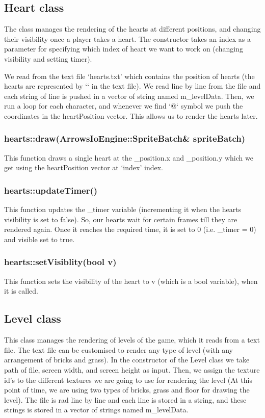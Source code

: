 \documentclass{article}
\begin{document}
\subsection{Heart class}
The class manages the rendering of the hearts at different positions, and changing their visibility once a player takes a heart. The constructor takes an index as a parameter for specifying which index of heart we want to work on (changing visibility and setting timer). \newline

We read from the text file ‘hearts.txt’ which contains the position of hearts (the hearts are represented by ‘\@‘ in the text file). We read line by line from the file and each string of line is pushed in a vector of string named m\_levelData. Then, we run a loop for each character, and whenever we find ‘@‘ symbol we push the coordinates in the heartPosition vector. This allows us to render the hearts later.
\newline

\subsubsection{hearts::draw(ArrowsIoEngine::SpriteBatch& spriteBatch) }
This function draws a single heart at the \_position.x and \_position.y which we get using the heartPosition vector at ‘index’ index.
\newline

\subsubsection{hearts::updateTimer() }
This function updates the \_timer variable (incrementing it when the hearts visibility is set to false). So, our hearts wait for certain frames till they are rendered again. Once it reaches the required time, it is set to 0 (i.e. \_timer = 0) and visible set to true.
\newline

\subsubsection{hearts::setVisiblity(bool v) }
This function sets the visibility of the heart to v (which is a bool variable), when it is called.
\newline

\subsection{Level class}
This class manages the rendering of levels of the game, which it reads from a text file. The text file can be customised to render any type of level (with any arrangement of bricks and grass). 
In the constructor of the Level class we take path of file, screen width, and screen height as input. Then, we assign the texture id’s to the different textures we are going to use for rendering the level (At this point of time, we are using two types of bricks, grass and floor for drawing the level). The file is rad line by line and each line is stored in a string, and these strings is stored in a vector of strings named m\_levelData. \\ 
\end{document}
